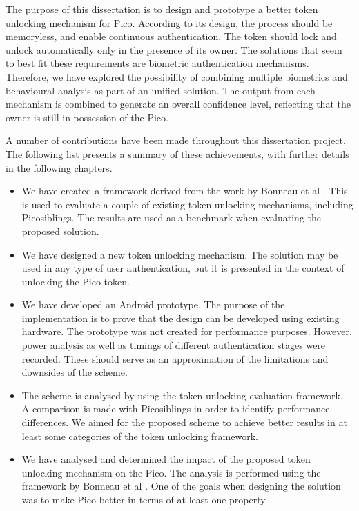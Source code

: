 The purpose of this dissertation is to design and prototype a better token unlocking mechanism for Pico. According to its design, the process should be memoryless, and enable continuous authentication. The token should lock and unlock automatically only in the presence of its owner. The solutions that seem to best fit these requirements are biometric authentication mechanisms. Therefore, we have explored the possibility of combining multiple biometrics and behavioural analysis as part of an unified solution. The output from each mechanism is combined to generate an overall confidence level, reflecting that the owner is still in possession of the Pico.

A number of contributions have been made throughout this dissertation project. The following list presents a summary of these achievements, with further details in the following chapters.
\begin{itemize}
	\item We have created a framework derived from the work by Bonneau et al \cite{bonneau2012quest}. This is used to evaluate a couple of existing token unlocking mechanisms, including Picosiblings. The results are used as a benchmark when evaluating the proposed solution.
	
	\item We have designed a new token unlocking mechanism. The solution may be used in any type of user authentication, but it is presented in the context of unlocking the Pico token. 
	
	\item We have developed an Android prototype. The purpose of the implementation is to prove that the design can be developed using existing hardware. The prototype was not created for performance purposes. However, power analysis as well as timings of different authentication stages were recorded. These should serve as an approximation of the limitations and downsides of the scheme.
	
	\item The scheme is analysed by using the token unlocking evaluation framework. A comparison is made with Picosiblings in order to identify performance differences. We aimed for the proposed scheme to achieve better results in at least some categories of the token unlocking framework.
		
	\item We have analysed and determined the impact of the proposed token unlocking mechanism on the Pico. The analysis is performed using the framework by Bonneau et al \cite{bonneau2012quest}. One of the goals when designing the solution was to make Pico better in terms of at least one property.
	
\end{itemize}	
